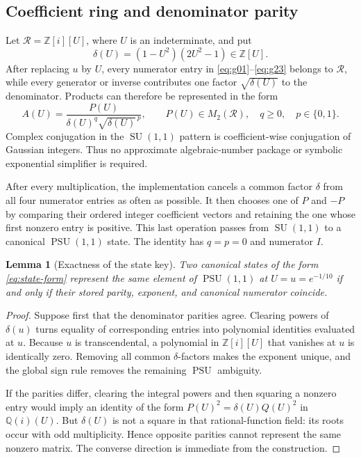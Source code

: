\documentclass[11pt,a4paper]{article}
\newtheorem{lemma}[theorem]{Lemma}
\theoremstyle{definition}
\newcommand{\Z}{\mathbb Z}
\newcommand{\Q}{\mathbb Q}
\newcommand{\PSU}{\operatorname{PSU}}
\newcommand{\SU}{\operatorname{SU}}
\begin{document}
\subsection{Coefficient ring and denominator parity}

Let \(\mathcal R=\Z[i][U]\), where \(U\) is an indeterminate, and put
\[
 \delta(U)=(1-U^2)(2U^2-1)\in\Z[U].
\]
After replacing \(u\) by \(U\), every numerator entry in
\eqref{eq:g01}--\eqref{eq:g23} belongs to \(\mathcal R\), while every generator
or inverse contributes one factor \(\sqrt{\delta(U)}\) to the denominator.
Products can therefore be represented in the form
\begin{equation}\label{eq:state-form}
 A(U)=\frac{P(U)}{\delta(U)^q\sqrt{\delta(U)}^{\,p}},
 \qquad P(U)\in M_2(\mathcal R),\quad q\geq0,\quad p\in\{0,1\}.
\end{equation}
Complex conjugation in the \(\SU(1,1)\) pattern is coefficient-wise
conjugation of Gaussian integers.  Thus no approximate algebraic-number
package or symbolic exponential simplifier is required.

After every multiplication, the implementation cancels a common factor
\(\delta\) from all four numerator entries as often as possible.  It then
chooses one of \(P\) and \(-P\) by comparing their ordered integer coefficient
vectors and retaining the one whose first nonzero entry is positive.  This
last operation passes from \(\SU(1,1)\) to a canonical \(\PSU(1,1)\) state.
The identity has \(q=p=0\) and numerator \(I\).

\begin{lemma}[Exactness of the state key]\label{lem:key}
Two canonical states of the form \eqref{eq:state-form} represent the same
element of \(\PSU(1,1)\) at \(U=u=e^{-1/10}\) if and only if their stored
parity, exponent, and canonical numerator coincide.
\end{lemma}

\begin{proof}
Suppose first that the denominator parities agree.  Clearing powers of
\(\delta(u)\) turns equality of corresponding entries into polynomial
identities evaluated at \(u\).  Because \(u\) is transcendental, a polynomial
in \(\Z[i][U]\) that vanishes at \(u\) is identically zero.  Removing all
common \(\delta\)-factors makes the exponent unique, and the global sign rule
removes the remaining \(\PSU\) ambiguity.

If the parities differ, clearing the integral powers and then squaring a
nonzero entry would imply an identity of the form
\(P(U)^2=\delta(U)Q(U)^2\) in \(\Q(i)(U)\).  But \(\delta(U)\) is not a square
in that rational-function field: its roots occur with odd multiplicity.
Hence opposite parities cannot represent the same nonzero matrix.  The
converse direction is immediate from the construction.
\end{proof}
\end{document}
